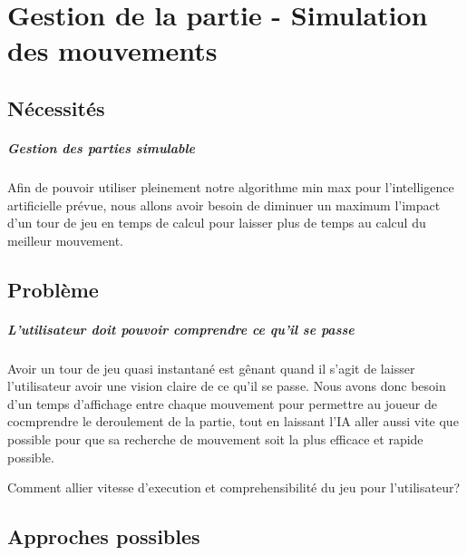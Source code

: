 \documentclass{scrreprt}
\begin{document}



    \chapter{Gestion de la partie - Simulation des mouvements}

    \section{Nécessités}

    \paragraph{Gestion des parties simulable}
    Afin de pouvoir utiliser pleinement notre algorithme min max pour
    l'intelligence artificielle prévue, nous allons avoir besoin de diminuer
    un maximum l'impact d'un tour de jeu en temps de calcul pour laisser plus
    de temps au calcul du meilleur mouvement.

    \section{Problème}

    \paragraph{L'utilisateur doit pouvoir comprendre ce qu'il se passe}
    Avoir un tour de jeu quasi instantané est gênant quand il s'agit de
    laisser l'utilisateur avoir une vision claire de ce qu'il se passe.
    Nous avons donc besoin d'un temps d'affichage entre chaque mouvement pour
    permettre au joueur de cocmprendre le deroulement de la partie, tout en
    laissant l'IA aller aussi vite que possible pour que sa recherche de
    mouvement soit la plus efficace et rapide possible.

    \begin{problem}
        Comment allier vitesse d'execution et comprehensibilité du jeu pour
        l'utilisateur?
    \end{problem}

    \section{Approches possibles}
\end{document}
